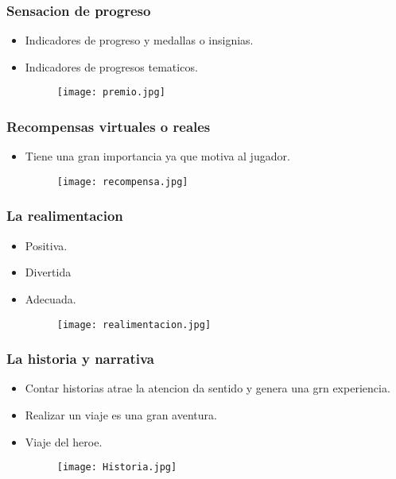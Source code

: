 \documentclass[11pt]{beamer}
\begin{document}
\begin{frame}
\frametitle{Sensacion de progreso}
\begin{itemize}
    \item Indicadores de progreso y medallas o insignias.
    \item Indicadores de progresos tematicos.
    \begin{figure}
        \texttt{[image: premio.jpg]}
        \label{fig:my_label}
    \end{figure}
\end{itemize}
\end{frame}



\begin{frame}
\frametitle{Recompensas virtuales o reales}
\begin{itemize}
    \item Tiene una gran importancia ya que motiva al jugador.
   
    \begin{figure}
        \texttt{[image: recompensa.jpg]}
        \label{fig:my_label}
    \end{figure}
\end{itemize}
\end{frame}



\begin{frame}
\frametitle{La realimentacion}
\begin{itemize}
    \item Positiva.
    \item Divertida
    \item Adecuada.
    \begin{figure}
        \texttt{[image: realimentacion.jpg]}
        \label{fig:my_label}
    \end{figure}
\end{itemize}
\end{frame}



\begin{frame}
\frametitle{La historia y narrativa}
\begin{itemize}
    \item Contar historias atrae la atencion da sentido y genera una grn experiencia.
    \item Realizar un viaje es una gran aventura.
    \item Viaje del heroe.
   
    \begin{figure}
        \texttt{[image: Historia.jpg]}
        \label{fig:my_label}
    \end{figure}
\end{itemize}
\end{frame}
\end{document}
